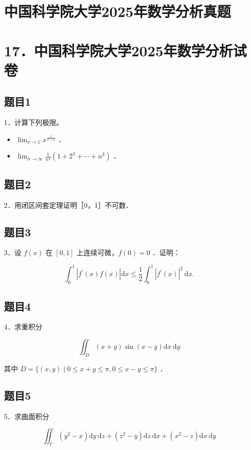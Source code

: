 \documentclass{article}
\begin{document}
\section*{中国科学院大学2025年数学分析真题}
\section*{17．中国科学院大学2025年数学分析试卷}

\subsection{题目1}
1．计算下列极限。

\begin{itemize}
  \item[（1）] \(\lim _{x \rightarrow 1} x^{\frac{1}{1-x}}\) ．
  \item[（2）] \(\lim _{n \rightarrow \infty} \frac{1}{n^{4}}\left(1+2^{3}+\cdots+n^{3}\right)\) ．
\end{itemize}

\subsection{题目2}
2．用闭区间套定理证明［0，1］不可数．

\subsection{题目3}
3．设 \(f(x)\) 在 \([0,1]\) 上连续可微，\(f(0)=0\) ．证明：

\[
\int_{0}^{1}\left|f^{\prime}(x) f(x)\right| \mathrm{d} x \leq \frac{1}{2} \int_{0}^{1}\left|f^{\prime}(x)\right|^{2} \mathrm{~d} x .
\]

\subsection{题目4}
4．求重积分

\[
\iint_{D}(x+y) \sin (x-y) \mathrm{d} x \mathrm{~d} y
\]

其中 \(D=\{(x, y) \mid 0 \leq x+y \leq \pi, 0 \leq x-y \leq \pi\}\) ．

\subsection{题目5}
5．求曲面积分

\[
\iint_{\Gamma}\left(y^{2}-x\right) \mathrm{d} y \mathrm{~d} z+\left(z^{2}-y\right) \mathrm{d} z \mathrm{~d} x+\left(x^{2}-z\right) \mathrm{d} x \mathrm{~d} y
\]
\end{document}
